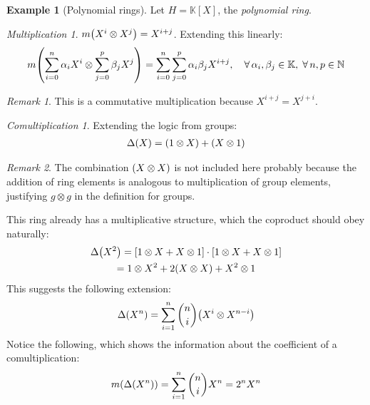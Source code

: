 \documentclass{article}
\theoremstyle{definition}
\newtheorem{Example}{Example}
\theoremstyle{remark}
\newtheorem*{Remark*}{Remark}
\theoremstyle{underline}
\newtheorem*{Multiplication*}{Multiplication}
\theoremstyle{underline}
\newtheorem*{Comultiplication*}{Comultiplication}
\begin{document}
	
	\begin{Example}[Polynomial rings]
		Let $H = \mathbb{K}[X]$, the \emph{polynomial ring}.
		
		\begin{Multiplication*}
			$m\pqty{X^i \otimes X^j} = X^{i+j}$. Extending this linearly:
			\begin{gather*}
			m\pqty{\sum_{i = 0}^n \alpha_i X^i \otimes \sum_{j = 0}^p \beta_j X^j} = \sum_{i = 0}^n \sum_{j = 0}^p \alpha_i \beta_j X^{i+j}, \quad \forall\,\alpha_i,\beta_j \in \mathbb K,\; \forall\,	n, p\in \mathbb N
			\end{gather*}
		\end{Multiplication*}
		
		\begin{Remark*}
			This is a commutative multiplication because $X^{i + j} = X^{j + i}$.
		\end{Remark*}
		
		\begin{Comultiplication*}
			Extending the logic from groups:
			\begin{gather*}
			\Delta\pqty{X} = \pqty{1 \otimes X} + \pqty{X \otimes 1}
			\end{gather*}
		\end{Comultiplication*}
		
		\begin{Remark*}
			The combination $\pqty{X \otimes X}$ is not included here probably because the addition of ring elements is analogous to multiplication of group elements, justifying $g \otimes g$ in the definition for groups. \\
		\end{Remark*}
		
		This ring already has a multiplicative structure, which the coproduct should obey naturally:
		\begin{gather*}
		\Delta\pqty{X^2} = \bqty{1 \otimes X + X \otimes 1} \cdot \bqty{1 \otimes X + X \otimes 1} \\
		= 1 \otimes X^2 + 2\pqty{X\otimes X} + X^2 \otimes 1 
		\end{gather*}
		This suggests the following extension:
		\begin{gather*}
		\Delta\pqty{X^{n}} = \sum_{i=1}^{n} \binom{n}{i}\pqty{X^{i} \otimes X^{n-i}} 
		\end{gather*}
		Notice the following, which shows the information about the coefficient of a comultiplication:
		\begin{gather*}
		m\pqty{\Delta\pqty{X^n}} = \sum_{i=1}^{n} \binom{n}{i}X^n =  2^nX^n
		\end{gather*}
		
	\end{Example}
	
\end{document}

